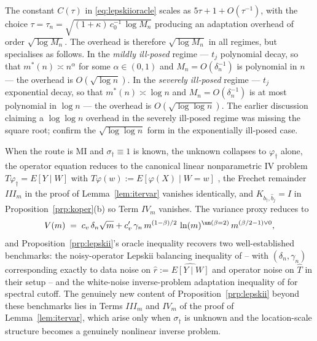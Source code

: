
\begin{remark}\label{rem:overhead}
The constant $C(\tau)$ in \eqref{eq:lepskiioracle} scales as $5\tau + 1 +
O(\tau^{-1})$, with the choice $\tau = \tau_n = \sqrt{(1+\kappa)\,c_0^{-1}\,\log M_n}$
producing an adaptation overhead of order $\sqrt{\log M_n}$. The overhead is
therefore $\sqrt{\log M_n}$ in all regimes, but specialises as follows. In
the \emph{mildly ill-posed} regime --- $t_j$ polynomial decay, so that
$m^*(n) \asymp n^\alpha$ for some $\alpha \in (0, 1)$ and
$M_n = O(\delta_n^{-1})$ is polynomial in $n$ --- the overhead is
$O(\sqrt{\log n})$. In the \emph{severely ill-posed} regime --- $t_j$
exponential decay, so that $m^*(n) \asymp \log n$ and $M_n = O(\delta_n^{-1})$
is at most polynomial in $\log n$ --- the overhead is
$O(\sqrt{\log\log n})$. The earlier discussion claiming a $\log\log n$
overhead in the severely ill-posed regime was missing the square root;
\citet{hofmannmathe2007} confirm the $\sqrt{\log\log n}$ form in the
exponentially ill-posed case.
\end{remark}

\begin{remark}\label{rem:linear-reduction}
When the route is MI and $\sigma_\dagger \equiv 1$ is known, the unknown
collapses to $\varphi_\dagger$ alone, the operator equation reduces to the
canonical linear nonparametric IV problem $T\varphi_\dagger = E[Y\mid W]$
with $T\varphi(w) := E[\varphi(X)\mid W = w]$
\citep{darolles2011, hall2005}, the Frechet remainder $III_m$ in the proof
of Lemma~\ref{lem:itervar} vanishes identically, and $K_{b_\dagger,\hat b_j}
= I$ in Proposition~\ref{prp:koper}\textup{(b)} so Term $IV_m$ vanishes.
The variance proxy reduces to
\[
V(m) \;=\; c_v\,\delta_n\sqrt m + c'_v\,\gamma_n\,m^{(1-\beta)/2}\,
\ln(m)^{\un(\beta = 2)}\,m^{(\beta/2-1)\vee 0},
\]
and Proposition~\ref{prp:lepskii}'s oracle inequality recovers two
well-established benchmarks: the noisy-operator Lepskii balancing inequality
of \citet{hoffmannreiss2008} -- with $(\delta_n, \gamma_n)$ corresponding
exactly to data noise on $\hat r := \widehat{E[Y\mid W]}$ and operator noise
on $\hat T$ in their setup -- and the white-noise inverse-problem
adaptation inequality of \citet{cavalier2002} for spectral cutoff. The
genuinely new content of Proposition~\ref{prp:lepskii} beyond these
benchmarks lies in Terms $III_m$ and $IV_m$ of the proof of
Lemma~\ref{lem:itervar}, which arise only when $\sigma_\dagger$ is
unknown and the location-scale structure becomes a genuinely nonlinear
inverse problem.
\end{remark}

